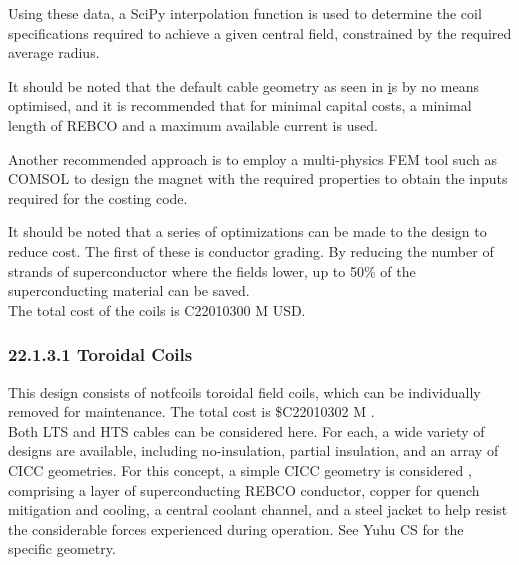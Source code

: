 Using these data, a SciPy interpolation function is used to determine the coil specifications required to achieve a given central field, constrained by the required average radius.

It should be noted that the default cable geometry as seen in \href{fig:yuhu_cs} is by no means optimised, and it is recommended that for minimal capital costs, a minimal length of REBCO and a maximum available current is used.


Another recommended approach is to employ a multi-physics FEM tool such as COMSOL to design the magnet with the required properties to obtain the inputs required for the costing code.

It should be noted that a series of optimizations can be made to the design to reduce cost. The first of these is conductor grading. By reducing the number of strands of superconductor where the fields lower, up to 50\% of the superconducting material can be saved. \\

The total cost of the coils is C22010300 M USD.


\subsubsection*{22.1.3.1 Toroidal Coils}

This design consists of notfcoils toroidal field coils, which can be individually removed for maintenance. The total cost is \$C22010302 M .\\

Both LTS and HTS cables can be considered here. For each, a wide variety of designs are available, including no-insulation, partial insulation, and an array of CICC geometries. For this concept, a simple CICC geometry is considered
, comprising a layer of superconducting REBCO conductor, copper for quench mitigation and cooling, a central coolant channel, and a steel jacket to help resist the considerable forces experienced during operation. See Yuhu CS
for the specific geometry.\\

